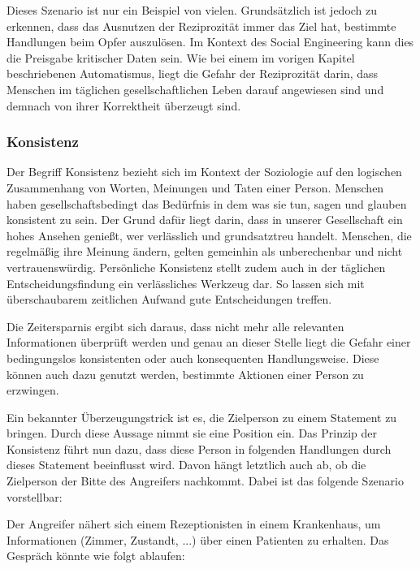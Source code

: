 Dieses Szenario ist nur ein Beispiel von vielen. Grundsätzlich ist jedoch zu erkennen, dass das Ausnutzen der Reziprozität immer das Ziel hat, bestimmte Handlungen beim Opfer auszulösen. Im Kontext des Social Engineering kann dies die Preisgabe kritischer Daten sein. Wie bei einem im vorigen Kapitel beschriebenen Automatismus, liegt die Gefahr der Reziprozität darin, dass Menschen im täglichen gesellschaftlichen Leben darauf angewiesen sind und demnach von ihrer Korrektheit überzeugt sind.

\subsubsection{Konsistenz}

Der Begriff Konsistenz bezieht sich im Kontext der Soziologie auf den logischen Zusammenhang von Worten, Meinungen und Taten einer Person. Menschen haben gesellschaftsbedingt das Bedürfnis in dem was sie tun, sagen und glauben konsistent zu sein. Der Grund dafür liegt darin, dass in unserer Gesellschaft ein hohes Ansehen genießt, wer verlässlich und grundsatztreu handelt. Menschen, die regelmäßig ihre Meinung ändern, gelten gemeinhin als unberechenbar und nicht vertrauenswürdig.
Persönliche Konsistenz stellt zudem auch in der täglichen Entscheidungsfindung ein verlässliches Werkzeug dar. So lassen sich mit überschaubarem zeitlichen Aufwand gute Entscheidungen treffen.

Die Zeitersparnis ergibt sich daraus, dass nicht mehr alle relevanten Informationen überprüft werden und genau an dieser Stelle liegt die Gefahr einer bedingungslos konsistenten oder auch konsequenten Handlungsweise. Diese können auch dazu genutzt werden, bestimmte Aktionen einer Person zu erzwingen. \citep{cialdini}

Ein bekannter Überzeugungstrick ist es, die Zielperson zu einem Statement zu bringen. Durch diese Aussage nimmt sie eine Position ein. Das Prinzip der Konsistenz führt nun dazu, dass diese Person in folgenden Handlungen durch dieses Statement beeinflusst wird. Davon hängt letztlich auch ab, ob die Zielperson der Bitte des Angreifers nachkommt. Dabei ist das folgende Szenario vorstellbar:

Der Angreifer nähert sich einem Rezeptionisten in einem Krankenhaus, um Informationen (Zimmer, Zustandt, ...) über einen Patienten zu erhalten.
Das Gespräch könnte wie folgt ablaufen:

 

